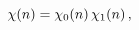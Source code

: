 \[\mathop{\chi\/}\nolimits\!\left(n\right)=\mathop{\chi_{0}\/}\nolimits\!\left(n%
\right)\mathop{\chi_{1}\/}\nolimits\!\left(n\right),\]